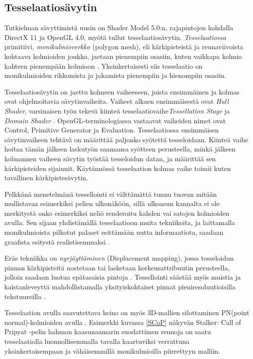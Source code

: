 \documentclass[finnish]{tktltiki2}
\theoremstyle{definition}
\theoremstyle{remark}
\begin{document}
\subsection{Tesselaatiosävytin}

Tutkielman sävyttimistä uusin on Shader Model 5.0:n, rajapintojen kohdalla DirectX 11 ja OpenGL 4.0, myötä tullut tesselaatiosävytin. \emph{Tesselaatiossa} primitiivi, \emph{monikulmioverkko} (polygon mesh), eli kärkipisteistä ja reunaviivoista kohtaava kolmioiden joukko\cite{Puh08}, jaetaan pienempiin osasiin, kuten vaikkapa kolmio kahteen pienempään kolmioon \cite{Nvi10}. Yksinkertaisesti siis tesselaatio on monikulmioiden rikkomista ja jakamista pienempiin ja hienompiin osasiin. 

Tesselaatiosävytin on jaettu kolmeen vaiheeseen, joista ensimmäinen ja kolmas ovat ohjelmoitavia sävytinvaiheita. Vaiheet alkaen ensimmäisestä ovat \emph{Hull Shader}, varsinaisen työn tekevä kiinteä tesselaatiovaihe\emph{Tessellation Stage} ja \emph{Domain Shader} \cite{Mic11}. OpenGL-terminologiassa vastaavat vaiheiden nimet ovat Control, Primitive Generator ja Evaluation. Tesselaatiossa ensimmäisen sävytinvaiheen tehtävä on määrittää paljonko syötettä tesseloidaan. Kiinteä vaihe hoitaa tämän jälkeen laskutyön saamansa syötteen perusteella, minkä jälkeen kolmannen vaiheen sävytin työstää tesseloidun datan, ja määrittää sen kärkipisteiden sijainnit. Käytännössä tesselaation kolmas vaihe toimii kuten tavallinen kärkipistesävytin.

Pelkkänä menetelmänä tessellointi ei välttämättä tunnu tuovan mitään mullistavaa esimerkiksi pelien ulkonäköön, sillä ulkoasun kannalta ei ole merkitystä onko esimerkiksi neliö renderoitu kahden vai satojen kolmioiden avulla. Sen sijaan yhdistämällä tesselaatioon muita tekniikoita, ja laittamalla monikulmioista pilkotut palaset esittämään uutta informaatiota, saadaan graafista esitystä realistisemmaksi \cite{Nvi10}. 

Eräs tekniikka on \emph{nyrjäyttäminen} (Displacement mapping), jossa tesseloidun pinnan kärkipisteitä nostetaan tai lasketaan korkeusattribuutin perusteella, jolloin saadaan luotua epätasaisia pintoja \cite{Nvi10}. Tessellointi säästää myös muistia ja kaistanleveyttä mahdollistamalla yksityiskohtaiset pinnat pieniresoluutioisilla tekstuureilla \cite{Mic11} \cite{Nvi10}.

Tesselaation avulla saavutettava keino on myös 3D-mallien silottaminen PN(point normal)-kolmioiden avulla \cite{Vla01}. Esimerkki kuvassa \ref{SCoP} näkyvän Stalker: Call of Pripyat -pelin hahmon kaasunaamarin suodattimen reunoja on saatu tesselaatiolla luonnollisemmalla tavalla kaartuviksi verrattuna yksinkertaisempaan ja vähäisemmillä monikulmioilla piirrettyyn malliin. 
\end{document}
